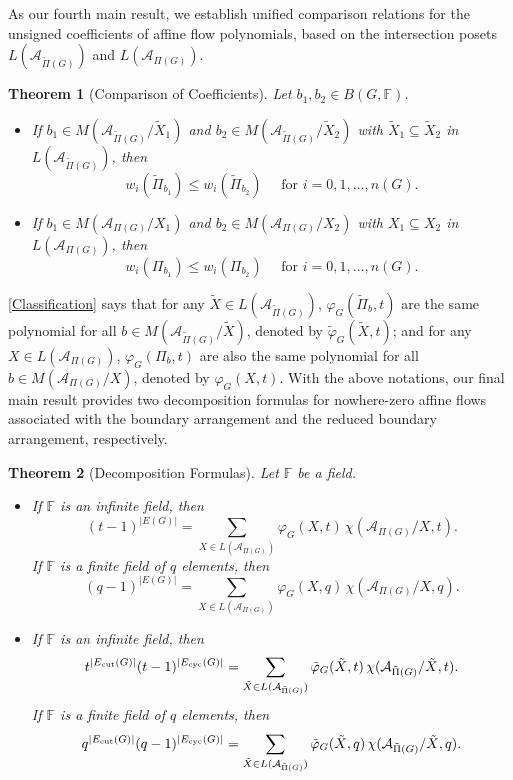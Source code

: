 \documentclass[12pt]{article}%
\renewcommand*{\bm}[1]{#1}%
\numberwithin{equation}{section}
\newtheorem{theorem}{Theorem}[section]
\begin{document}
As our fourth main result, we establish unified comparison relations for the unsigned coefficients of affine flow polynomials, based on the intersection posets $L(\mathcal{A}_{\tilde{\Pi}(G)})$ and $L(\mathcal{A}_{\Pi(G)})$.
\begin{theorem}[Comparison of Coefficients]\label{thm:comparison}
Let $\bm b_1, \bm b_2\in B(G,\mathbb{F})$. 
\begin{itemize} 
\item[{\rm (a)}] If $\bm b_1\in M(\mathcal{A}_{\tilde{\Pi}(G)}/\tilde{X}_1)$ and  $\bm b_2\in M(\mathcal{A}_{\tilde{\Pi}(G)}/\tilde{X}_2)$ with $\tilde{X}_1\subseteq\tilde{X}_2$ in $L(\mathcal{A}_{\tilde{\Pi}(G)})$, then 
\[
w_i(\tilde{\Pi}_{\bm b_1})\le w_i(\tilde{\Pi}_{\bm b_2}) \quad\text{ for } i=0,1,\ldots,n(G).
\] 
\item[{\rm (b)}]If $\bm b_1\in M(\mathcal{A}_{\Pi(G)}/X_1)$ and  $\bm b_2\in M(\mathcal{A}_{\Pi(G)}/X_2)$ with $X_1\subseteq X_2$ in $L(\mathcal{A}_{\Pi(G)})$, then 
\[
w_i(\Pi_{\bm b_1})\le w_i(\Pi_{\bm b_2}) \quad\text{ for } i=0,1,\ldots,n(G).
\] 
\end{itemize}
\end{theorem}

\autoref{Classification} says that for any $\tilde{X}\in L(\mathcal{A}_{\tilde{\Pi}(G)})$, $\varphi_G(\tilde{\Pi}_{\bm b},t)$ are the same polynomial for all $\bm b\in M(\mathcal{A}_{\tilde{\Pi}(G)}/\tilde{X})$, denoted by $\tilde{\varphi}_G(\tilde{X},t)$; and for any $X\in L(\mathcal{A}_{\Pi(G)})$, $\varphi_G(\Pi_{\bm b},t)$ are also the same polynomial for all $\bm b\in M(\mathcal{A}_{\Pi(G)}/X)$, denoted by  $\varphi_G(X,t)$. With the above notations, our final main result provides two decomposition formulas for nowhere-zero affine flows associated with the boundary arrangement and the reduced boundary arrangement, respectively. 
\begin{theorem}[Decomposition Formulas]\label{Dec1} Let $\mathbb{F}$ be a field. 
\begin{itemize}
\item[{\rm (a)}]
If $\mathbb{F}$ is an infinite field, then
\[
(t-1)^{|E(G)|}=\sum_{X\in L(\mathcal{A}_{\Pi(G)})}\varphi_G(X,t)\,\chi(\mathcal{A}_{\Pi(G)}/X,t).
\]
If $\mathbb{F}$ is a finite field of $q$ elements, then
\[
(q-1)^{|E(G)|}=\sum_{X\in L(\mathcal{A}_{\Pi(G)})}\varphi_G(X,q)\,\chi(\mathcal{A}_{\Pi(G)}/X,q).
\]
\item[{\rm (b)}]
If $\mathbb{F}$ is an infinite field, then
\[
t^{|E_{\rm cut}(G)|}(t-1)^{|E_{\rm cyc}(G)|}=\sum_{\tilde{X}\in L(\mathcal{A}_{\tilde{\Pi}(G)})}\tilde{\varphi}_G(\tilde{X},t)\,\chi(\mathcal{A}_{\tilde{\Pi}(G)}/\tilde{X},t).
\]
If $\mathbb{F}$ is a finite field of $q$ elements, then
\[
q^{|E_{\rm cut}(G)|}(q-1)^{|E_{\rm cyc}(G)|}=\sum_{\tilde{X}\in L(\mathcal{A}_{\tilde{\Pi}(G)})}\tilde{\varphi}_G(\tilde{X},q)\,\chi(\mathcal{A}_{\tilde{\Pi}(G)}/\tilde{X},q).
\]
\end{itemize}
\end{theorem}
\end{document}
